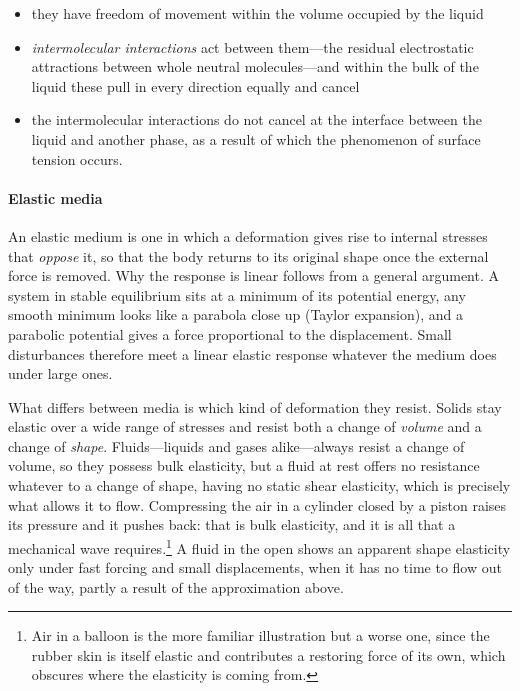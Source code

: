         \begin{itemize}
            \item they have freedom of movement within the volume occupied by the liquid
            \item \emph{intermolecular interactions} act between them---the residual electrostatic attractions between whole neutral molecules---and within the bulk of the liquid these pull in every direction equally and cancel
            \item the intermolecular interactions do not cancel at the interface between the liquid and another phase, as a result of which the phenomenon of surface tension occurs.
        \end{itemize}

   \paragraph{Elastic media}

        An elastic medium is one in which a deformation gives rise to internal stresses that \emph{oppose} it, so that the body returns to its original shape once the external force is removed. Why the response is linear follows from a general argument. A system in stable equilibrium sits at a minimum of its potential energy, any smooth minimum looks like a parabola close up (Taylor expansion), and a parabolic potential gives a force proportional to the displacement. Small disturbances therefore meet a linear elastic response whatever the medium does under large ones.

        What differs between media is which kind of deformation they resist. Solids stay elastic over a wide range of stresses and resist both a change of \emph{volume} and a change of \emph{shape}. Fluids---liquids and gases alike---always resist a change of volume, so they possess bulk elasticity, but a fluid at rest offers no resistance whatever to a change of shape, having no static shear elasticity, which is precisely what allows it to flow. Compressing the air in a cylinder closed by a piston raises its pressure and it pushes back: that is bulk elasticity, and it is all that a mechanical wave requires.\footnote{Air in a balloon is the more familiar illustration but a worse one, since the rubber skin is itself elastic and contributes a restoring force of its own, which obscures where the elasticity is coming from.} A fluid in the open shows an apparent shape elasticity only under fast forcing and small displacements, when it has no time to flow out of the way, partly a result of the approximation above.

